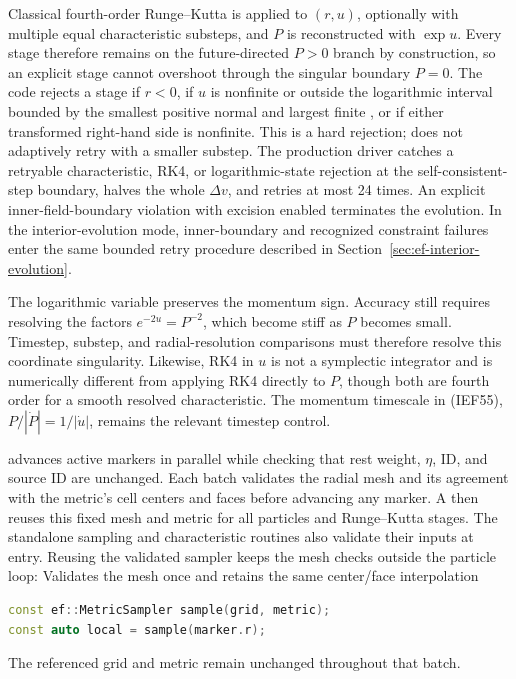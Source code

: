 Classical fourth-order Runge--Kutta is applied to \((r,u)\), optionally with
multiple equal characteristic substeps, and \(P\) is reconstructed with
\(\exp u\).  Every stage therefore remains on the future-directed \(P>0\)
branch by construction, so an explicit stage cannot overshoot through the
singular boundary \(P=0\).  The code rejects a stage if \(r<0\), if \(u\) is
nonfinite or outside the logarithmic interval bounded by the smallest
positive normal and largest finite , or if either transformed
right-hand side is nonfinite.
This is a hard rejection;  does not adaptively retry with a
smaller substep.  The production driver catches a retryable characteristic,
RK4, or logarithmic-state rejection at the self-consistent-step boundary,
halves the whole \(\Delta v\), and retries at most 24 times. An explicit
inner-field-boundary violation with excision enabled terminates the evolution.
In the interior-evolution
mode, inner-boundary and recognized constraint failures enter the same
bounded retry procedure described in Section~\ref{sec:ef-interior-evolution}.

The logarithmic variable preserves the momentum sign.  Accuracy still
requires resolving the factors \(e^{-2u}=P^{-2}\), which become stiff as
\(P\) becomes small.  Timestep, substep, and radial-resolution comparisons
must therefore resolve this coordinate singularity.  Likewise, RK4 in \(u\) is not a
symplectic integrator and is numerically different from applying RK4
directly to \(P\), though both are fourth order for a smooth resolved
characteristic.  The momentum timescale in (IEF55),
\(P/|\dot P|=1/|\dot u|\), remains the relevant timestep control.

 advances active markers in parallel
while checking that rest weight, \(\eta\), ID, and source ID are unchanged.
Each batch validates the radial mesh and its agreement with the metric's
cell centers and faces before advancing any marker. A 
then reuses this fixed mesh and metric for all particles and Runge--Kutta
stages. The standalone sampling and characteristic routines also validate
their inputs at entry. Reusing the validated sampler keeps the mesh checks
outside the particle loop:
{}
{Validates the mesh once and retains the same center/face interpolation}
\begin{lstlisting}[language=C++,basicstyle=\ttfamily\scriptsize]
const ef::MetricSampler sample(grid, metric);
const auto local = sample(marker.r);
\end{lstlisting}
The referenced grid and metric remain unchanged throughout that batch.

